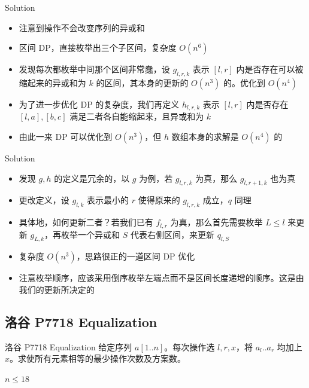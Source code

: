 ﻿\documentclass[aspectratio=169]{ctexbeamer}
\begin{document}
\begin{frame}{Solution}
    \begin{itemize}
        \item 注意到操作不会改变序列的异或和
        \item 区间 DP，直接枚举出三个子区间，复杂度 $O(n^6)$
        \item 发现每次都枚举中间那个区间非常蠢，设 $g_{l,r,k}$ 表示 $[l,r]$ 内是否存在可以被缩起来的异或和为 $k$ 的区间，其本身的更新的 $O(n^3)$ 的。优化到 $O(n^4)$
        \item 为了进一步优化 DP 的复杂度，我们再定义 $h_{l,r,k}$ 表示 $[l,r]$ 内是否存在 $[l,a],[b,c]$ 满足二者各自能缩起来，且异或和为 $k$
        \item 由此一来 DP 可以优化到 $O(n^3)$，但 $h$ 数组本身的求解是 $O(n^4)$ 的
    \end{itemize}
\end{frame}

\begin{frame}{Solution}
    \begin{itemize}
        \item 发现 $g,h$ 的定义是冗余的，以 $g$ 为例，若 $g_{l,r,k}$ 为真，那么 $g_{l,r+1,k}$ 也为真
        \item 更改定义，设 $g_{l,k}$ 表示最小的 $r$ 使得原来的 $g_{l,r,k}$ 成立，$q$ 同理
        \item 具体地，如何更新二者？若我们已有 $f_{l,r}$ 为真，那么首先需要枚举 $L\le l$ 来更新 $g_{L,k}$，再枚举一个异或和 $S$ 代表右侧区间，来更新 $q_{l,S}$
        \item 复杂度 $O(n^3)$，思路很正的一道区间 DP 优化
        \item 注意枚举顺序，应该采用倒序枚举左端点而不是区间长度递增的顺序。这是由我们的更新所决定的 
    \end{itemize}
\end{frame}

\subsection{洛谷 P7718 Equalization}
\begin{frame}{洛谷 P7718 Equalization}
    给定序列 $a[1..n]$。每次操作选 $l,r,x$，将 $a_l..a_r$ 均加上 $x$。求使所有元素相等的最少操作次数及方案数。
    
    $n\le 18$
\end{frame}
\end{document}
